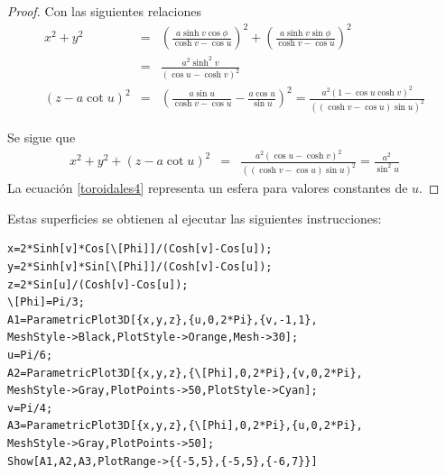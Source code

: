 \begin{proof}
Con las siguientes relaciones
{\small
\begin{eqnarray*}
x^{2}+y^{2} &=&\left( \frac{a\sinh v\cos \phi }{\cosh v-\cos u}\right)
^{2}+\left( \frac{a\sinh v\sin \phi }{\cosh v-\cos u}\right)
^{2} \\ &=& \frac{a^{2}\sinh ^{2}v}{\left( \cos u-\cosh v\right) ^{2}} \\
\left( z-a\cot u\right) ^{2} &=& \left( \frac{a\sin u}{\cosh v-\cos u}-\frac{a\cos u}{\sin u}\right) ^{2} %
= \frac{a^{2}\left( 1-\cos u\cosh v\right) ^{2}}{\left(
\left( \cosh v-\cos u\right) \sin u\right) ^{2}}
\end{eqnarray*}
}

Se sigue que
\begin{eqnarray}
x^{2}+y^{2}+\left( z-a\cot u\right) ^{2}
&=& \frac{a^{2}\left( \cos u-\cosh v\right) ^{2}}{\left( \left( \cosh v-\cos u\right)
\sin u\right) ^{2}} =\frac{a^{2}}{\sin ^{2}u} \label{toroidales4}
\end{eqnarray}
La ecuación \ref{toroidales4} representa un esfera para valores constantes de $u$.
\end{proof}

Estas superficies se obtienen al ejecutar las siguientes instrucciones:

%

\begin{tcolorbox}[title=\bf Instrucción \verb"Mathematica"]\begin{Verbatim}[formatcom=\letraverbatim]
x=2*Sinh[v]*Cos[\[Phi]]/(Cosh[v]-Cos[u]);
y=2*Sinh[v]*Sin[\[Phi]]/(Cosh[v]-Cos[u]);
z=2*Sin[u]/(Cosh[v]-Cos[u]);
\[Phi]=Pi/3;
A1=ParametricPlot3D[{x,y,z},{u,0,2*Pi},{v,-1,1},
MeshStyle->Black,PlotStyle->Orange,Mesh->30];
u=Pi/6;
A2=ParametricPlot3D[{x,y,z},{\[Phi],0,2*Pi},{v,0,2*Pi},
MeshStyle->Gray,PlotPoints->50,PlotStyle->Cyan];
v=Pi/4;
A3=ParametricPlot3D[{x,y,z},{\[Phi],0,2*Pi},{u,0,2*Pi},
MeshStyle->Gray,PlotPoints->50];
Show[A1,A2,A3,PlotRange->{{-5,5},{-5,5},{-6,7}}]
\end{Verbatim}
\end{tcolorbox}


